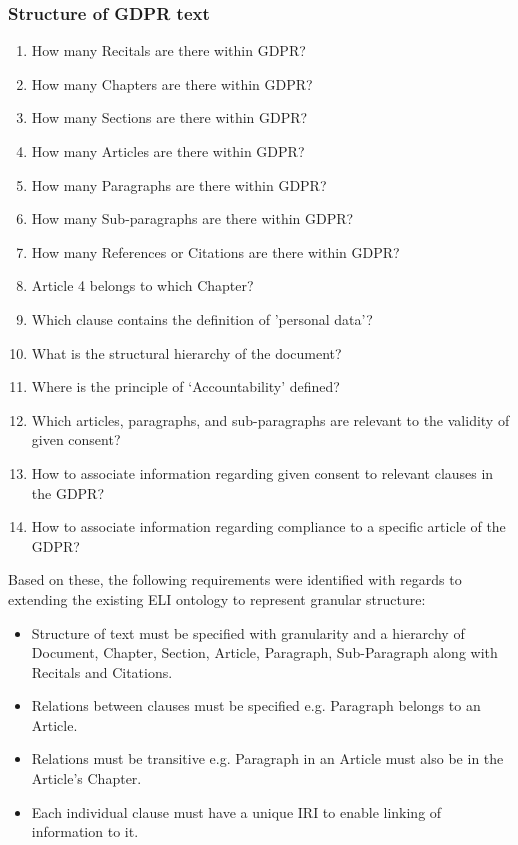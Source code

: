 \subsubsection{Structure of GDPR text}
\begin{enumerate}[label={\texttt{CQ.\theenumi}}]
    \item How many Recitals are there within GDPR?
    \item How many Chapters are there within GDPR?
    \item How many Sections are there within GDPR?
    \item How many Articles are there within GDPR?
    \item How many Paragraphs are there within GDPR?
    \item How many Sub-paragraphs are there within GDPR?
    \item How many References or Citations are there within GDPR?
    \item Article 4 belongs to which Chapter?
    \item Which clause contains the definition of 'personal data'?
    \item What is the structural hierarchy of the document?
    \item Where is the principle of `Accountability' defined?
    \item Which articles, paragraphs, and sub-paragraphs are relevant to the validity of given consent?
    \item How to associate information regarding given consent to relevant clauses in the GDPR?
    \item How to associate information regarding compliance to a specific article of the GDPR?
\end{enumerate}

Based on these, the following requirements were identified with regards to extending the existing ELI ontology to represent granular structure:
\begin{itemize}
    \item Structure of text must be specified with granularity and a hierarchy of Document, Chapter, Section, Article, Paragraph, Sub-Paragraph along with Recitals and Citations.
    \item Relations between clauses must be specified e.g. Paragraph belongs to an Article.
    \item Relations must be transitive e.g. Paragraph in an Article must also be in the Article's Chapter.
    \item Each individual clause must have a unique IRI to enable linking of information to it.
\end{itemize}

